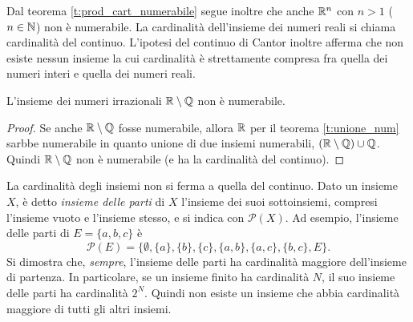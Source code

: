 Dal teorema \ref{t:prod_cart_numerabile} segue inoltre che anche $\mathbb{R}^n$ con $n>1$ ($n\in\mathbb{N}$) non è numerabile.
La cardinalità dell'insieme dei numeri reali si chiama cardinalità del continuo. L'ipotesi del continuo di Cantor inoltre afferma che non esiste nessun insieme la cui cardinalità è strettamente compresa fra quella dei numeri interi e quella dei numeri reali.
\begin{corollario}
L'insieme dei numeri irrazionali $\mathbb{R}\setminus\mathbb{Q}$ non è numerabile.
\end{corollario}
\begin{proof}
Se anche $\mathbb{R}\setminus\mathbb{Q}$ fosse numerabile, allora $\mathbb{R}$ per il teorema \ref{t:unione_num} sarbbe numerabile in quanto unione di due insiemi numerabili, $(\mathbb{R}\setminus\mathbb{Q})\cup\mathbb{Q}$. Quindi $\mathbb{R}\setminus\mathbb{Q}$ non è numerabile (e ha la cardinalità del continuo).
\end{proof}
La cardinalità degli insiemi non si ferma a quella del continuo. Dato un insieme $X$, è detto \emph{insieme delle parti} di $X$ l'insieme dei suoi sottoinsiemi, compresi l'insieme vuoto e l'insieme stesso, e si indica con $\mathcal P(X)$. Ad esempio, l'insieme delle parti di $E=\{a,b,c\}$ è
\[
\mathcal P(E)=\Big\{\emptyset,\{a\},\{b\},\{c\},\{a,b\},\{a,c\},\{b,c\},E\Big\}.
\]
Si dimostra che, \textit{sempre}, l'insieme delle parti ha cardinalità maggiore dell'insieme di partenza. In particolare, se un insieme finito ha cardinalità $N$, il suo insieme delle parti ha cardinalità $2^N$.
Quindi non esiste un insieme che abbia cardinalità maggiore di tutti gli altri insiemi.
